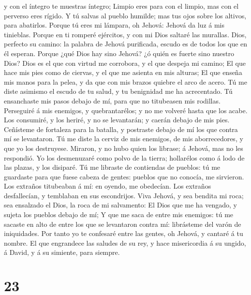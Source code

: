 y con el íntegro te muestras íntegro;  Limpio eres para
con el limpio, mas con el perverso eres rígido.  Y tú
salvas al pueblo humilde; mas tus ojos sobre los altivos, para
abatirlos.  Porque tú eres mi lámpara, oh Jehová: Jehová
da luz á mis tinieblas.  Porque en ti romperé ejércitos,
y con mi Dios saltaré las murallas.  Dios, perfecto su
camino: la palabra de Jehová purificada, escudo es de todos los que en
él esperan.  Porque ¿qué Dios hay sino Jehová? ¿ó quién
es fuerte sino nuestro Dios?  Dios es el que con virtud
me corrobora, y el que despeja mi camino;  El que hace
mis pies como de ciervas, y el que me asienta en mis alturas;
 El que enseña mis manos para la pelea, y da que con mis
brazos quiebre el arco de acero.  Tú me diste asimismo el
escudo de tu salud, y tu benignidad me ha acrecentado. 
Tú ensanchaste mis pasos debajo de mí, para que no titubeasen mis
rodillas.  Perseguiré á mis enemigos, y quebrantarélos; y
no me volveré hasta que los acabe.  Los consumiré, y los
heriré, y no se levantarán; y caerán debajo de mis pies. 
Ceñísteme de fortaleza para la batalla, y postraste debajo de mí los que
contra mí se levantaron.  Tú me diste la cerviz de mis
enemigos, de mis aborrecedores, y que yo los destruyese. 
Miraron, y no hubo quien los librase; á Jehová, mas no les respondió.
 Yo los desmenuzaré como polvo de la tierra; hollarélos
como á lodo de las plazas, y los disiparé.  Tú me
libraste de contiendas de pueblos: tú me guardaste para que fuese cabeza
de gentes: pueblos que no conocía, me sirvieron.  Los
extraños titubeaban á mí: en oyendo, me obedecían.  Los
extraños desfallecían, y temblaban en sus escondrijos. 
Viva Jehová, y sea bendita mi roca; sea ensalzado el Dios, la roca de mi
salvamento:  El Dios que me ha vengado, y sujeta los
pueblos debajo de mí;  Y que me saca de entre mis
enemigos: tú me sacaste en alto de entre los que se levantaron contra
mí: librásteme del varón de iniquidades.  Por tanto yo te
confesaré entre las gentes, oh Jehová, y cantaré á tu nombre.
 El que engrandece las saludes de su rey, y hace
misericordia á su ungido, á David, y á su simiente, para siempre.

\hypertarget{section-22}{%
\section{23}\label{section-22}}

